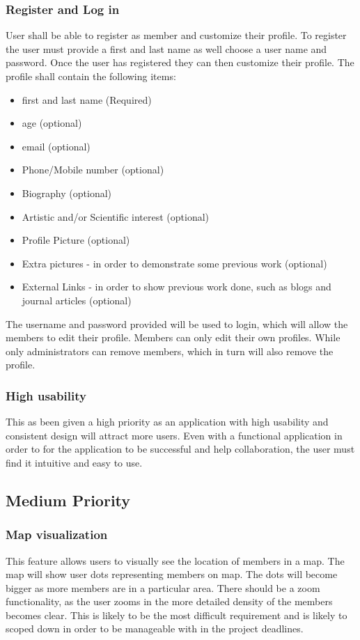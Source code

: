 \documentclass[a4paper,oneside,11pt]{report}
\begin{document}
\subsubsection{Register and Log in} 
 User shall be able to register as member and customize their profile. To register the user must provide a first and last name as well choose a user name and password. Once the user has registered they can then customize their profile. The profile shall contain the following items:
 \begin{itemize}
 \item first and last name (Required)
 \item age (optional)
 \item email (optional)
 \item Phone/Mobile number (optional)
 \item Biography (optional)
 \item Artistic and/or Scientific interest (optional)
 \item Profile Picture (optional)
 \item Extra pictures - in order to demonstrate some previous work (optional)
 \item External Links - in order to show previous work done, such as blogs and journal articles (optional)
 \end{itemize}
 The username and password provided will be used to login, which will allow the members to edit their profile.
 	Members can only edit their own profiles. While only administrators can remove members, which in turn will also remove the profile.

\subsubsection{High usability} 
This as been given a high priority as an application with high usability and consistent design will attract more users. Even with a functional application in order to for the application to be successful and help collaboration, the user must find it intuitive and easy to use.
\subsection{Medium Priority}
\subsubsection{Map visualization}
This feature allows users to visually see the location of members in a map. The map will show user dots representing members on map. The dots will become bigger as more members are in a particular area. There should be a zoom functionality, as the user zooms in the more detailed density of the members becomes clear. This is likely to be the most difficult requirement and is likely to scoped down in order to be manageable with in the project deadlines.
\end{document}
